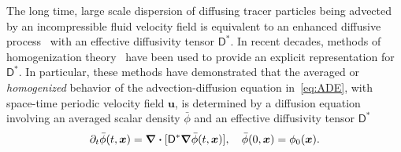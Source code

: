 \documentclass[leqno,onefignum,onetabnum]{siamltex1213}
\newcommand{\Dm}{\mathsf{D}}
\newcommand{\Sm}{\mathsf{S}}
\newcommand{\Am}{\mathsf{A}}
\newcommand\bnabla{\mbox{\boldmath${\nabla}$}}
\providecommand\bcdot{\boldsymbol{\cdot}}
\newcommand{\vecx}{\boldsymbol{x}}
\newcommand{\vecu}{\boldsymbol{u}}
\newcommand{\vecxi}{\boldsymbol{\xi}}
\begin{document}
The long time, large scale dispersion of diffusing tracer particles
being advected by an incompressible fluid velocity field is equivalent
to an enhanced diffusive process~\cite{Taylor:PRSL:196} with an
effective diffusivity tensor $\Dm^*$. In recent decades, methods of
homogenization
theory~\cite{McLaughlin:SIAM_JAM:780,Fannjiang:1994:SIAM_JAM:333,Majda:Kramer:1999:book}
have been used to provide an explicit representation for
$\Dm^*$. In particular, these methods have demonstrated that the
averaged or \emph{homogenized} behavior of the advection-diffusion
equation in~\eqref{eq:ADE}, with space-time periodic velocity field
$\vecu$, is determined by a diffusion equation
involving an averaged scalar density $\bar{\phi}$ and an
effective diffusivity tensor
$\Dm^*$~\cite{Majda:Kramer:1999:book}       
%
\begin{align}\label{eq:phi_bar}
 \partial_t\bar{\phi}(t,\vecx)=\bnabla\bcdot[\Dm^*\bnabla \bar{\phi}(t,\vecx)], \quad
  \bar{\phi}(0,\vecx)=\phi_0(\vecx).
\end{align}
%



\end{document}
